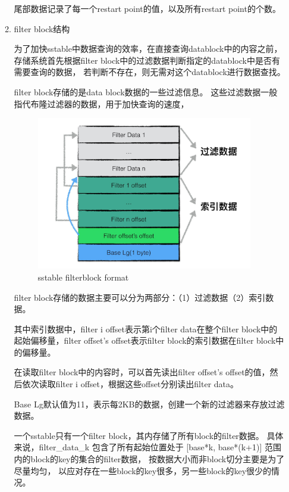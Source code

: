\begin{enumerate}
\begin{enumerate}
	尾部数据记录了每一个restart point的值，以及所有restart point的个数。
	
	\item filter block结构
	
	为了加快sstable中数据查询的效率，在直接查询datablock中的内容之前，
	存储系统首先根据filter block中的过滤数据判断指定的datablock中是否有需要查询的数据，
	若判断不存在，则无需对这个datablock进行数据查找。
	
	filter block存储的是data block数据的一些过滤信息。
	这些过滤数据一般指代布隆过滤器的数据，用于加快查询的速度，
	
	\begin{figure}[H]
		\centering
		\includegraphics[width=0.95\textwidth]{images/filterblock_format.jpeg}
		\caption{sstable filterblock format}
		\label{sstable_filterblock_format}
	\end{figure}

	filter block存储的数据主要可以分为两部分：（1）过滤数据（2）索引数据。
	
	其中索引数据中，filter i offset表示第i个filter data在整个filter block中的起始偏移量，filter offset's offset表示filter block的索引数据在filter block中的偏移量。
	
	在读取filter block中的内容时，可以首先读出filter offset's offset的值，然后依次读取filter i offset，根据这些offset分别读出filter data。
	
	Base Lg默认值为11，表示每2KB的数据，创建一个新的过滤器来存放过滤数据。
	
	一个sstable只有一个filter block，其内存储了所有block的filter数据。
	具体来说，filter\_data\_k 包含了所有起始位置处于 [base*k, base*(k+1)]
	范围内的block的key的集合的filter数据，
	按数据大小而非block切分主要是为了尽量均匀，
	以应对存在一些block的key很多，另一些block的key很少的情况。
	

\end{enumerate}
\end{enumerate}
